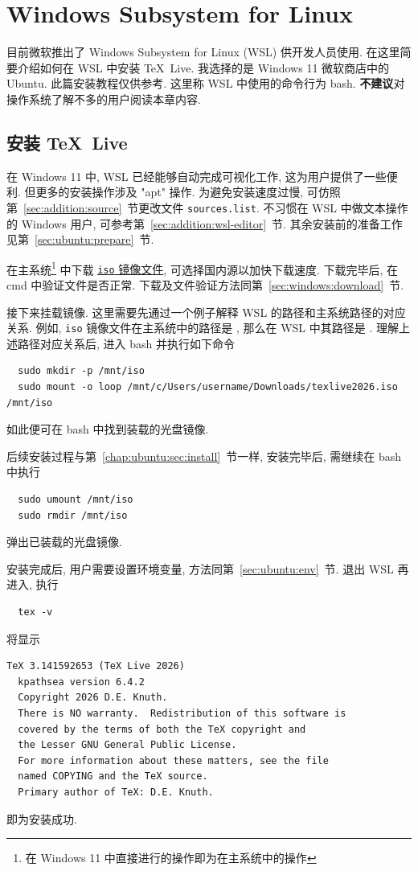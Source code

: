 
\chapter{Windows Subsystem for Linux}

目前微软推出了 Windows Subsystem for Linux (WSL) 供开发人员使用.
在这里简要介绍如何在 WSL 中安装 \TeX~Live.
我选择的是 Windows 11 微软商店中的 Ubuntu.
此篇安装教程仅供参考.
这里称 WSL 中使用的命令行为 \textsf{bash}.
\textbf{不建议}对操作系统了解不多的用户阅读本章内容.

\section{安装 \TeX~Live}

在 Windows 11 中,
WSL 已经能够自动完成可视化工作,
这为用户提供了一些便利.
但更多的安装操作涉及 "apt" 操作.
为避免安装速度过慢,
可仿照第~\ref{sec:addition:source}~节更改文件 \texttt{sources.list}.
不习惯在 WSL 中做文本操作的 Windows 用户,
可参考第~\ref{sec:addition:wsl-editor}~节.
其余安装前的准备工作见第~\ref{sec:ubuntu:prepare}~节.

在主系统\footnote{在 Windows 11 中直接进行的操作即为在主系统中的操作}%
中下载
\href{https://mirrors.ctan.org/systems/texlive/Images/texlive2026.iso}{\texttt{iso} 镜像文件},
可选择国内源以加快下载速度.
下载完毕后, 在 \textsf{cmd} 中验证文件是否正常.
下载及文件验证方法同第~\ref{sec:windows:download}~节.

接下来挂载镜像.
这里需要先通过一个例子解释 WSL 的路径和主系统路径的对应关系.
例如, \texttt{iso} 镜像文件在主系统中的路径是 ,
那么在 WSL 中其路径是 .
理解上述路径对应关系后,
进入 \textsf{bash} 并执行如下命令
\begin{lstlisting}
  sudo mkdir -p /mnt/iso
  sudo mount -o loop /mnt/c/Users/username/Downloads/texlive2026.iso /mnt/iso
\end{lstlisting}
如此便可在 \textsf{bash} 中找到装载的光盘镜像.

后续安装过程与第~\ref{chap:ubuntu:sec:install}~节一样,
安装完毕后, 需继续在 \textsf{bash} 中执行
\begin{lstlisting}
  sudo umount /mnt/iso
  sudo rmdir /mnt/iso
\end{lstlisting}
弹出已装载的光盘镜像.

安装完成后,
用户需要设置环境变量,
方法同第~\ref{sec:ubuntu:env}~节.
退出 WSL 再进入,
执行
\begin{lstlisting}
  tex -v
\end{lstlisting}
将显示
\begin{lstlisting}[language = {}]
  TeX 3.141592653 (TeX Live 2026)
  kpathsea version 6.4.2
  Copyright 2026 D.E. Knuth.
  There is NO warranty.  Redistribution of this software is
  covered by the terms of both the TeX copyright and
  the Lesser GNU General Public License.
  For more information about these matters, see the file
  named COPYING and the TeX source.
  Primary author of TeX: D.E. Knuth.
\end{lstlisting}
即为安装成功.

